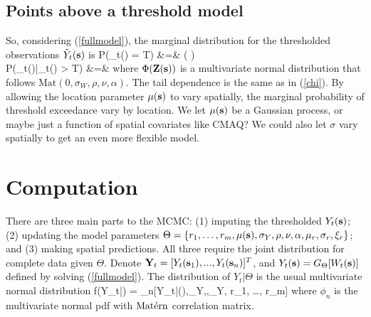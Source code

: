 \documentclass[11pt]{article}
\begin{document}


\subsection{Points above a threshold model}\label{s:pot}

So, considering (\ref{fullmodel}), the marginal distribution for the thresholded observations ${\tilde Y}_t(\mbox{\bf s})$ is  
\beqn\label{Ytmarg}
  P(\Yt_t(\bs) = T) &=& \Phi\left( \right)\\
  P(\Yt_t(\bs)|\Yt_t(\bs) > T)  &=& \nonumber
\eeqn
where $\Phi(\mbox{\bf Z}(\mbox{\bf s}))$ is a multivariate normal distribution that follows $\mbox{Mat}(0,\sigma_W,\rho,\nu, \alpha)$. The tail dependence is the same as in (\ref{chi}).  By allowing the location parameter $\mu(\mbox{\bf s})$ to vary spatially, the marginal probability of threshold exceedance vary by location.  We let $\mu(\mbox{\bf s})$ be a Gaussian process, or maybe just a function of spatial covariates like CMAQ?  We could also let $\sigma$ vary spatially to get an even more flexible model.


\section{Computation}\label{s:comp}

There are three main parts to the MCMC: (1) imputing the thresholded $Y_t(\mbox{\bf s})$; (2) updating the model parameters $\Theta=\{r_1,\ldots,r_m,\mu(\mbox{\bf s}),\sigma_Y,\rho, \nu, \alpha, \mu_r, \sigma_r, \xi_r\}$; and (3) making spatial predictions.  All three require the joint distribution for complete data given $\Theta$.  Denote $\mbox{\bf Y}_t = [Y_t(\mbox{\bf s}_1),...,Y_t(\mbox{\bf s}_n)]^T$, and $Y_t(\mbox{\bf s})=G_{\Theta}[W_t(\mbox{\bf s})]$ defined by solving (\ref{fullmodel}).  The distribution of $Y_t|\Theta$ is the usual multivariate normal distribution
\beqn\label{copula}
   f(Y_t|\Theta) = \phi_n[Y_t|\mu(\bs),\sigma_Y,\rho,\nu_Y, r_1, \ldots, r_m]
\eeqn
where $\phi_n$ is the multivariate normal pdf with $\mbox{Mat$\acute{\mbox{e}}$rn}$ correlation matrix.
\end{document}
